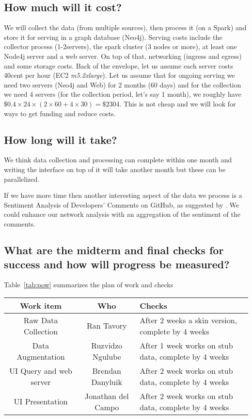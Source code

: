 \documentclass[sigconf,11pt]{acmart}
\begin{document}
\subsection*{How much will it cost?}
We will collect the data (from multiple sources), then process it (on a Spark) and
store it for serving in a graph database (Neo4j\cite{neo4j}).
Serving costs include the collector process (1-2servers), the spark cluster (3 nodes or more),
at least one Node4j server and a web server.
On top of that, networking (ingress and egress) and some storage costs.
Back of the envelope, let us assume each server costs 40cent per hour (EC2 \emph{m5.2xlarge}).
Let us assume that for ongoing serving we need two servers (Neo4j and Web) for 2 months (60 days)
and for the collection we need 4 servers (for the collection period, let's say 1 month),
we roughly have $\$0.4 \times 24 \times (2 \times 60 + 4 \times 30) = \$2304$.
This is not cheap and we will look for ways to get funding and reduce costs.


\subsection*{How long will it take?}
We think data collection and processing can complete within one month and writing the interface on top of it will take another month
but these can be parallelized.

If we have more time then another interesting aspect of the data we process is a
Sentiment Analysis of Developers' Comments on GitHub, as suggested by \citeauthor{sentiment-analysis}\cite{sentiment-analysis}.
We could enhance our network analysis with an aggregation of the sentiment of the comments.

\subsection*{What are the midterm and final checks for success and how will progress be measured?}
Table~\ref{tab:pow} summarizes the plan of work and checks

\begin{table*}
  \caption{Plan of Work}
  \label{tab:pow}
  \begin{tabular}{ccl}
    \toprule
    Work item               & Who                 & Checks\\
    \midrule
    Raw Data Collection     & Ran Tavory          & After 2 weeks a skin version, complete by 4 weeks \\
    Data Augmentation       & Ruzvidzo Ngulube    & After 1 week works on stub data, complete by 4 weeks\\
    UI Query and web server & Brendan Danyluik    & After 2 week works on stub data, complete by 4 weeks\\
    UI Presentation         & Jonathan del Campo  & After 2 week works on stub data, complete by 4 weeks\\
  \bottomrule
\end{tabular}
\end{table*}
\end{document}
